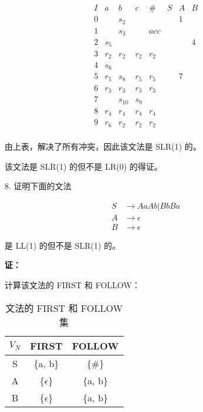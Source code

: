 \begin{enumerate}
    \begin{equation*}
        \begin{array}{c|cccc|ccc}
            I & a & b & c & \# & S & A & B \\
            \hline
            0 & & s_2 & & & & 1 & \\
            1 & & s_3 & & acc & & & \\
            2 & s_5 & & & & & & 4 \\
            3 & r_2 & r_2 & r_2 & r_2 & & & \\
            4 & s_6 & & & & & & \\
            5 & r_5 & s_8 & r_5 & r_5 & & 7 & \\
            6 & r_3 & r_3 & r_3 & r_3 & & & \\
            7 & & s_{10} & s_9 & & & & \\
            8 & r_4 & r_4 & r_4 & r_4 & & & \\
            9 & r_6 & r_2 & r_2 & r_2 & & & \\
        \end{array}
    \end{equation*}
    
    由上表，解决了所有冲突，因此该文法是 SLR(1) 的。
    
    该文法是 SLR(1) 的但不是 LR(0) 的得证。
    
    \item[8.] 证明下面的文法
    
    \begin{align*}
        S & \to AaAb | BbBa \\
        A & \to \epsilon \\
        B & \to \epsilon
    \end{align*}
    
    是 LL(1) 的但不是 SLR(1) 的。
    
    \textbf{证：}
    
    计算该文法的 FIRST 和 FOLLOW：
    
    \begin{table}[H]
        \centering
        \begin{tabular}{c|cc}
            $V_N$ & FIRST & FOLLOW \\
            \hline
            S & \{a, b\} & \{\#\} \\
            A & \{$\epsilon$\} & \{a, b\} \\
            B & \{$\epsilon$\} & \{a, b\} \\
        \end{tabular}
        \caption{文法的 FIRST 和 FOLLOW 集}
        \label{tab:FF_8}
    \end{table}
    

\end{enumerate}
